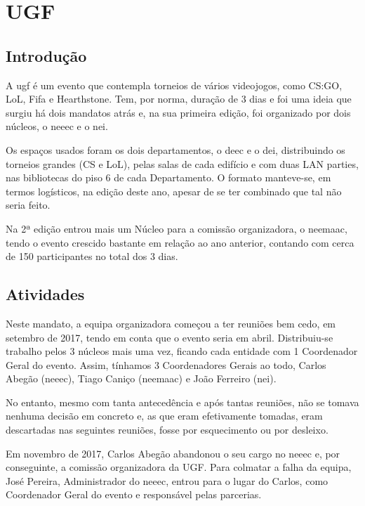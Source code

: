 
\section{UGF}

\subsection{Introdução}

 A \acrfull{ugf} é um evento que contempla torneios de vários videojogos, como CS:GO, LoL, Fifa e Hearthstone. Tem, por norma, duração de 3 dias e foi uma ideia que surgiu há dois mandatos atrás e, na sua primeira edição, foi organizado por dois núcleos, o \acrshort{neeec} e o \acrshort{nei}.

Os espaços usados foram os dois departamentos, o \acrshort{deec} e o \acrshort{dei}, distribuindo os torneios grandes (CS e LoL), pelas salas de cada edifício e com duas LAN parties, nas bibliotecas do piso 6 de cada Departamento. O formato manteve-se, em termos logísticos, na edição deste ano, apesar de se ter combinado que tal não seria feito.

Na 2ª edição entrou mais um Núcleo para a comissão organizadora, o \acrshort{neemaac}, tendo o evento crescido bastante em relação ao ano anterior, contando com cerca de 150 participantes no total dos 3 dias.

\subsection{Atividades}

Neste mandato, a equipa organizadora começou a ter reuniões bem cedo, em setembro de 2017, tendo em conta que o evento seria em abril. Distribuiu-se trabalho pelos 3 núcleos mais uma vez, ficando cada entidade com 1 Coordenador Geral do evento. Assim, tínhamos 3 Coordenadores Gerais ao todo, Carlos Abegão (\acrshort{neeec}), Tiago Caniço (\acrshort{neemaac}) e João Ferreiro (\acrshort{nei}).

No entanto, mesmo com tanta antecedência e após tantas reuniões, não se tomava nenhuma decisão em concreto e, as que eram efetivamente tomadas, eram descartadas nas seguintes reuniões, fosse por esquecimento ou por desleixo.

Em novembro de 2017, Carlos Abegão abandonou o seu cargo no \acrshort{neeec} e, por conseguinte, a comissão organizadora da UGF. Para colmatar a falha da equipa, José Pereira, Administrador do \acrshort{neeec}, entrou para o lugar do Carlos, como Coordenador Geral do evento e responsável pelas parcerias.

